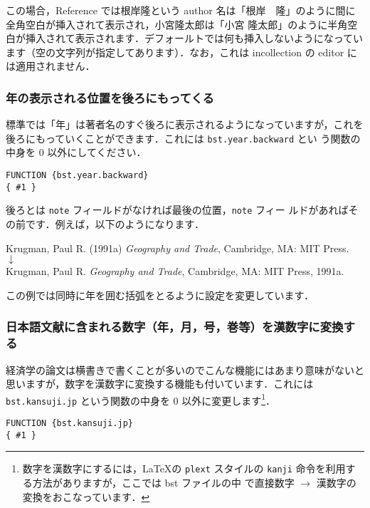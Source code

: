 \documentclass[article]{jlreq}
\begin{document}
この場合，Reference では根岸隆という author 名は「根岸　隆」のように間に
全角空白が挿入されて表示され，小宮隆太郎は「小宮 隆太郎」のように半角空
白が挿入されて表示されます．デフォールトでは何も挿入しないようになってい
ます（空の文字列が指定してあります）．なお，これは incollection の editor 
には適用されません．

\subsubsection{年の表示される位置を後ろにもってくる}

標準では「年」は著者名のすぐ後ろに表示されるようになっていますが，これを
後ろにもっていくことができます．これには \texttt{bst.year.backward} とい
う関数の中身を 0 以外にしてください．
\begin{screen}
\begin{verbatim}
FUNCTION {bst.year.backward}
{ #1 }
\end{verbatim}
\end{screen}

後ろとは \texttt{note} フィールドがなければ最後の位置，\texttt{note} フィー
ルドがあればその前です．例えば，以下のようになります．
\begin{center}
 Krugman, Paul R. (1991a) \textit{Geography and Trade}, Cambridge, MA:
 MIT Press. \\
 $\downarrow$ \\
 Krugman, Paul R. \textit{Geography and Trade}, Cambridge, MA: MIT Press, 1991a.
\end{center}
この例では同時に年を囲む括弧をとるように設定を変更しています．

\subsubsection{日本語文献に含まれる数字（年，月，号，巻等）を漢数字に変換する}

経済学の論文は横書きで書くことが多いのでこんな機能にはあまり意味がないと
思いますが，数字を漢数字に変換する機能も付いています．これには 
\texttt{bst.kansuji.jp} という関数の中身を 0 以外に変更します\footnote
{数字を漢数字にするには，\LaTeX の \texttt{plext} スタイルの 
\texttt{kanji} 命令を利用する方法がありますが，ここでは bst ファイルの中
で直接数字 $\rightarrow$ 漢数字の変換をおこなっています．}．
\begin{screen}
\begin{verbatim}
FUNCTION {bst.kansuji.jp}
{ #1 }
\end{verbatim}
\end{screen}
\end{document}
